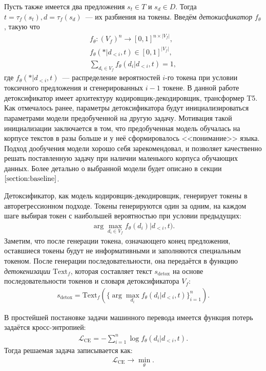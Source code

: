 Пусть также имеется два предложения $s_t \in T$ и $s_d \in D$.
Тогда $t = \tau_{f}(s_t), d = \tau_{f}(s_d)$~--- их разбиения на токены.
Введём \textit{детокисфикатор} $f_{\theta}$, такую что 
\begin{gather*}
    f_{\theta}: \left(V_f\right)^{n} \to [0, 1]^{n \times |V_f|}, \\
    f_{\theta}(* | d_{<i}, t) \in [0, 1]^{|V_f|}, \\
    \sum_{d_i \in V_f} f_\theta(d_i | d_{<i}, t) = 1,
\end{gather*}
где $f_{\theta}(* | d_{<i}, t)$~--- распределение вероятностей $i$-го токена при условии токсичного предложения и сгенерированных $i-1$ токене.
В данной работе детоксификатор имеет архитектуру кодировщик-декодировщик, трансформер T5\cite{t5}. 
Как отмечалось ранее, параметры детоксификатора будут инициализироваться параметрами модели предобученной на другую задачу. 
Мотивация такой инициализации заключается в том, что предобученная модель обучалась на корпусе текстов в разы больше и у неё сформировалось <<понимание>> языка.
Подход дообучения модели хорошо себя зарекомендовал, и позволяет качественно решать поставленную задачу при наличии маленького корпуса обучающих данных\cite{sun2019fine}.  
Более детально о выбранной модели будет описано в секции $\ref{section:baseline}$.

Детоксификатор, как модель кодировщик-декодировщик, генерирует токены в авторегрессионном подходе.
Токены генерируются один за одним, на каждом шаге выбирая токен с наибольшей вероятностью при условии предыдущих: 
\begin{gather*}
    \arg\max_{d_{i} \in V_f} f_{\theta}(d_i) | d_{<i}, t).
\end{gather*}
Заметим, что после генерации токена, означающего конец предложения, оставшиеся токены будут не информативными и заполняются специальным токеном. 
После генерации последовательности, она передаётся в функцию \textit{детокенизации} $\text{Text}_f$, которая составляет текст $s_{\text{detox}}$ на основе последовательности токенов и словаря детоксификатора $V_{f}$:
\begin{gather*}
    s_{\text{detox}} = \text{Text}_{f}\left( \{\arg\max_{d_i} f_{\theta}(d_{i} | d_{<i}, t)\}_{i=1}^{n} \right).
\end{gather*}

В простейшей постановке задачи машинного перевода имеется функция потерь задаётся кросс-энтропией:
\begin{gather*}
    \mathcal{L}_{\text{CE}} = -\sum_{i=1}^{n} \log f_\theta(d_{i} | d_{<i}, t).
\end{gather*}
Тогда решаемая задача записывается как:
\begin{gather*}
    \mathcal{L}_{\text{CE}} \longrightarrow \min_{\theta}.
\end{gather*}


